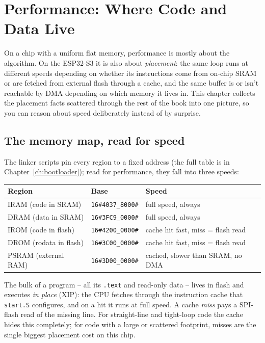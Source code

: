 \chapter{Performance: Where Code and Data Live}
\label{ch:perf}

On a chip with a uniform flat memory, performance is mostly about the algorithm. On
the ESP32-S3 it is also about \emph{placement}: the same loop runs at different
speeds depending on whether its instructions come from on-chip SRAM or are fetched
from external flash through a cache, and the same buffer is or isn't reachable by
DMA depending on which memory it lives in. This chapter collects the placement facts
scattered through the rest of the book into one picture, so you can reason about
speed deliberately instead of by surprise.

\section{The memory map, read for speed}

The linker scripts pin every region to a fixed address (the full table is in
Chapter~\ref{ch:bootloader}); read for performance, they fall into three speeds:

\begin{center}
\begin{tabular}{l l l}
\toprule
\textbf{Region} & \textbf{Base} & \textbf{Speed} \\ \midrule
IRAM (code in SRAM)   & \texttt{16\#4037\_8000\#} & full speed, always \\
DRAM (data in SRAM)   & \texttt{16\#3FC9\_0000\#} & full speed, always \\
IROM (code in flash)  & \texttt{16\#4200\_0000\#} & cache hit fast, miss = flash read \\
DROM (rodata in flash)& \texttt{16\#3C00\_0000\#} & cache hit fast, miss = flash read \\
PSRAM (external RAM)  & \texttt{16\#3D00\_0000\#} & cached, slower than SRAM, no DMA \\
\bottomrule
\end{tabular}
\end{center}

The bulk of a program -- all its \texttt{.text} and read-only data -- lives in
flash and executes \emph{in place} (XIP): the CPU fetches through the instruction
cache that \texttt{start.S} configures, and on a hit it runs at full speed. A cache
\emph{miss} pays a SPI-flash read of the missing line. For straight-line and
tight-loop code the cache hides this completely; for code with a large or scattered
footprint, misses are the single biggest placement cost on this chip.

